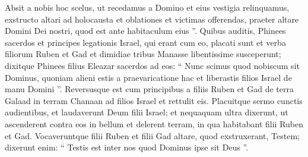 \begin{biblechapter}
\begin{biblechapter}
\begin{biblechapter}
\begin{biblechapter}
\begin{biblechapter}
\begin{biblechapter}
\begin{biblechapter}
\begin{biblechapter}
\begin{biblechapter}
\begin{biblechapter}
\begin{biblechapter}
\begin{biblechapter}
\begin{biblechapter}
\begin{biblechapter}
\begin{biblechapter}
\begin{biblechapter}
\begin{biblechapter}
\begin{biblechapter}
\begin{biblechapter}
\begin{biblechapter}
\begin{biblechapter}
\begin{biblechapter}
\verse Absit a nobis hoc scelus, ut recedamus a Domino et eius vestigia relinquamus, exstructo altari ad holocausta et oblationes et victimas offerendas, praeter altare Domini Dei nostri, quod est ante habitaculum eius ”.
 \verse Quibus auditis, Phinees sacerdos et principes legationis Israel, qui erant cum eo, placati sunt et verba filiorum Ruben et Gad et dimidiae tribus Manasse libentissime susceperunt; 
\verse dixitque Phinees filius Eleazar sacerdos ad eos: “ Nunc scimus quod nobiscum sit Dominus, quoniam alieni estis a praevaricatione hac et liberastis filios Israel de manu Domini ”.
 \verse Reversusque est cum principibus a filiis Ruben et Gad de terra Galaad in terram Chanaan ad filios Israel et rettulit eis. 
\verse Placuitque sermo cunctis audientibus, et laudaverunt Deum filii Israel; et nequaquam ultra dixerunt, ut ascenderent contra eos in bellum et delerent terram, in qua habitabant filii Ruben et Gad. 
\verse Vocaveruntque filii Ruben et filii Gad altare, quod exstruxerant, Testem; dixerunt enim: “ Testis est inter nos quod Dominus ipse sit Deus ”.
 

\end{biblechapter}
\end{biblechapter}
\end{biblechapter}
\end{biblechapter}
\end{biblechapter}
\end{biblechapter}
\end{biblechapter}
\end{biblechapter}
\end{biblechapter}
\end{biblechapter}
\end{biblechapter}
\end{biblechapter}
\end{biblechapter}
\end{biblechapter}
\end{biblechapter}
\end{biblechapter}
\end{biblechapter}
\end{biblechapter}
\end{biblechapter}
\end{biblechapter}
\end{biblechapter}
\end{biblechapter}
